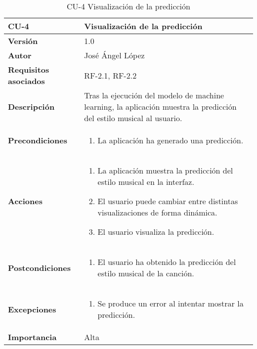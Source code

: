 \begin{table}[p]
	\centering
	\begin{tabularx}{\linewidth}{ p{} p{} }
		\toprule
		\textbf{CU-4}    & \textbf{Visualización de la predicción}\\
		\toprule
		\textbf{Versión}              & 1.0    \\
		\textbf{Autor}                & José Ángel López \\
		\textbf{Requisitos asociados} & RF-2.1, RF-2.2 \\
		\textbf{Descripción}          & Tras la ejecución del modelo de machine learning, la aplicación muestra la predicción del estilo musical al usuario. \\
		\textbf{Precondiciones}        & 
		\begin{enumerate}		    
			\def\labelenumi{\arabic{enumi}.}
			\tightlist
			\item La aplicación ha generado una predicción.
		\end{enumerate}\\
		\textbf{Acciones}             &
		\begin{enumerate}
			\def\labelenumi{\arabic{enumi}.}
			\tightlist
			\item La aplicación muestra la predicción del estilo musical en la interfaz.
			\item El usuario puede cambiar entre distintas visualizaciones de forma dinámica.
			\item El usuario visualiza la predicción.
		\end{enumerate}\\
		\textbf{Postcondiciones} &
		\begin{enumerate}
			\def\labelenumi{\arabic{enumi}.}
			\tightlist
			\item El usuario ha obtenido la predicción del estilo musical de la canción.
		\end{enumerate}\\
		\textbf{Excepciones} &
		\begin{enumerate}
			\def\labelenumi{\arabic{enumi}.}
			\tightlist
			\item Se produce un error al intentar mostrar la predicción.
		\end{enumerate}\\
		\textbf{Importancia}          & Alta \\
		\bottomrule
	\end{tabularx}
	\caption{CU-4 Visualización de la predicción}
\end{table}

